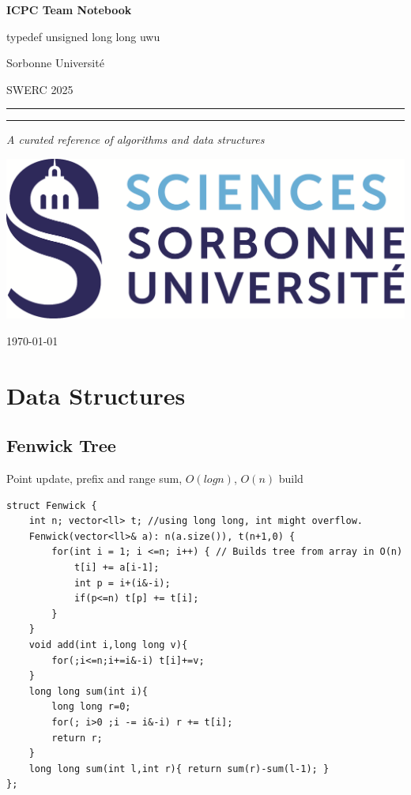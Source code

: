 \documentclass[10pt,a4paper]{article}
\begin{document}
\begin{titlepage}
  \centering

  \vspace*{2cm}
  {\Huge\bfseries ICPC Team Notebook\par}
  \vspace{1cm}

  {\Large {typedef unsigned long long uwu}\par}
  {\Large {Sorbonne Université}\par}
  {\Large SWERC 2025\par}
  \vspace{1.5cm}

  \rule{\linewidth}{1.5pt}\par
  \vspace{0.5cm}
  \rule{\linewidth}{0.5pt}\par
  \vspace{1.5cm}

  {\LARGE \itshape A curated reference of algorithms and data structures\par}
  \vspace{1cm}

  \includegraphics[width=0.2 \textwidth]{img/logo.png}\par
  \vspace{1cm}

  {\large \today\par}

  \clearpage
\end{titlepage}


\clearpage
\tableofcontents

\twocolumn

\section{Data Structures}

\subsection{Fenwick Tree}

Point update, prefix and range sum, $O(log n)$, $O(n)$ build
\begin{verbatim}
struct Fenwick {
    int n; vector<ll> t; //using long long, int might overflow.
    Fenwick(vector<ll>& a): n(a.size()), t(n+1,0) {
        for(int i = 1; i <=n; i++) { // Builds tree from array in O(n)
            t[i] += a[i-1];
            int p = i+(i&-i);
            if(p<=n) t[p] += t[i];
        }
    }
    void add(int i,long long v){
        for(;i<=n;i+=i&-i) t[i]+=v;
    }
    long long sum(int i){
        long long r=0;
        for(; i>0 ;i -= i&-i) r += t[i];
        return r;
    }
    long long sum(int l,int r){ return sum(r)-sum(l-1); }
};
\end{verbatim}
\end{document}
